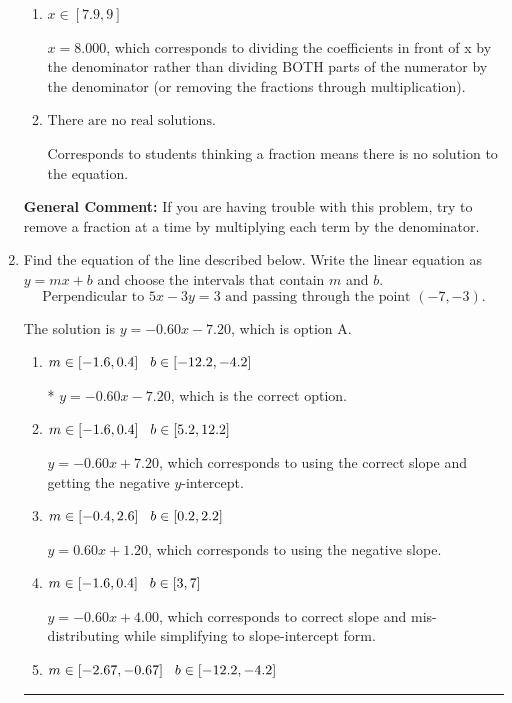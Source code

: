 \documentclass{extbook}[14pt]
\newcommand{\litem}[1]{\item #1

\rule{\textwidth}{0.4pt}}
\begin{document}
\begin{enumerate}
{\begin{enumerate}[label=\Alph*.]
 $x = 0.328$, which corresponds to dividing the second number in the numerator by the denominator rather than dividing BOTH parts of the numerator by the denominator (or removing the fractions through multiplication).
\item \( x \in [7.9, 9] \)

 $x = 8.000$, which corresponds to dividing the coefficients in front of x by the denominator rather than dividing BOTH parts of the numerator by the denominator (or removing the fractions through multiplication).
\item \( \text{There are no real solutions.} \)

Corresponds to students thinking a fraction means there is no solution to the equation.
\end{enumerate}

\textbf{General Comment:} If you are having trouble with this problem, try to remove a fraction at a time by multiplying each term by the denominator.
}
\litem{
Find the equation of the line described below. Write the linear equation as $ y=mx+b $ and choose the intervals that contain $m$ and $b$.
\[ \text{Perpendicular to } 5 x - 3 y = 3 \text{ and passing through the point } (-7, -3). \]

The solution is \( y = -0.60x - 7.20 \), which is option A.\begin{enumerate}[label=\Alph*.]
\item \( m \in [-1.6, 0.4] \hspace*{3mm} b \in [-12.2, -4.2] \)

* $y = -0.60x - 7.20$, which is the correct option.
\item \( m \in [-1.6, 0.4] \hspace*{3mm} b \in [5.2, 12.2] \)

 $y = -0.60x + 7.20$, which corresponds to using the correct slope and getting the negative $y$-intercept.
\item \( m \in [-0.4, 2.6] \hspace*{3mm} b \in [0.2, 2.2] \)

 $y = 0.60x + 1.20$, which corresponds to using the negative slope.
\item \( m \in [-1.6, 0.4] \hspace*{3mm} b \in [3, 7] \)

 $y = -0.60x + 4.00$, which corresponds to correct slope and mis-distributing while simplifying to slope-intercept form.
\item \( m \in [-2.67, -0.67] \hspace*{3mm} b \in [-12.2, -4.2] \)


\end{enumerate}}
\end{enumerate}
\end{document}
